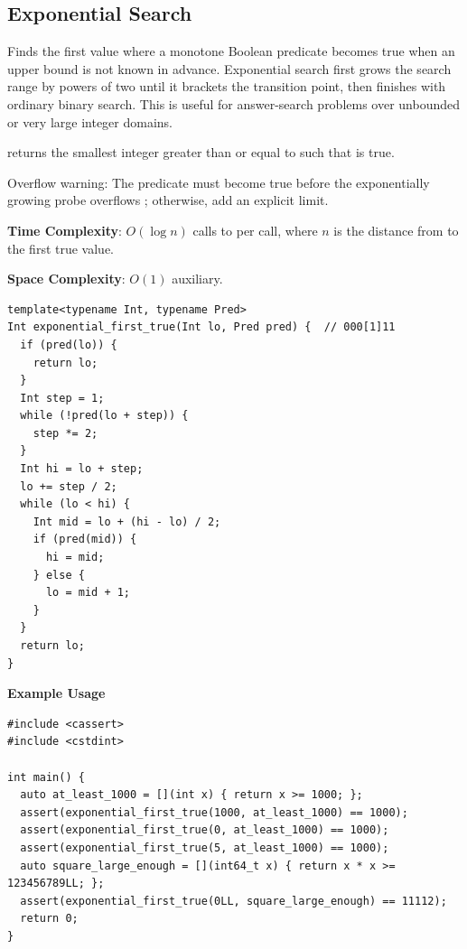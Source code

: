 \subsection{Exponential Search}
\label{sec:5.1.2}
Finds the first value where a monotone Boolean predicate becomes true when an upper bound is not known in advance. Exponential search first grows the search range by powers of two until it brackets the transition point, then finishes with ordinary binary search. This is useful for answer-search problems over unbounded or very large integer domains.

\begin{compactitem}
  \item {} returns the smallest integer  greater than or equal to  such that  is true.
\end{compactitem}

Overflow warning: The predicate must become true before the exponentially growing probe overflows ; otherwise, add an explicit limit.

\textbf{Time Complexity}: $O(\log n)$ calls to  per call, where $n$ is the distance from  to the first true value.

\textbf{Space Complexity}: $O(1)$ auxiliary.

\begin{lstlisting}[style=cpp]
template<typename Int, typename Pred>
Int exponential_first_true(Int lo, Pred pred) {  // 000[1]11
  if (pred(lo)) {
    return lo;
  }
  Int step = 1;
  while (!pred(lo + step)) {
    step *= 2;
  }
  Int hi = lo + step;
  lo += step / 2;
  while (lo < hi) {
    Int mid = lo + (hi - lo) / 2;
    if (pred(mid)) {
      hi = mid;
    } else {
      lo = mid + 1;
    }
  }
  return lo;
}
\end{lstlisting}
\textbf{Example Usage}\par
\begin{lstlisting}[style=cpp]
#include <cassert>
#include <cstdint>

int main() {
  auto at_least_1000 = [](int x) { return x >= 1000; };
  assert(exponential_first_true(1000, at_least_1000) == 1000);
  assert(exponential_first_true(0, at_least_1000) == 1000);
  assert(exponential_first_true(5, at_least_1000) == 1000);
  auto square_large_enough = [](int64_t x) { return x * x >= 123456789LL; };
  assert(exponential_first_true(0LL, square_large_enough) == 11112);
  return 0;
}
\end{lstlisting}
